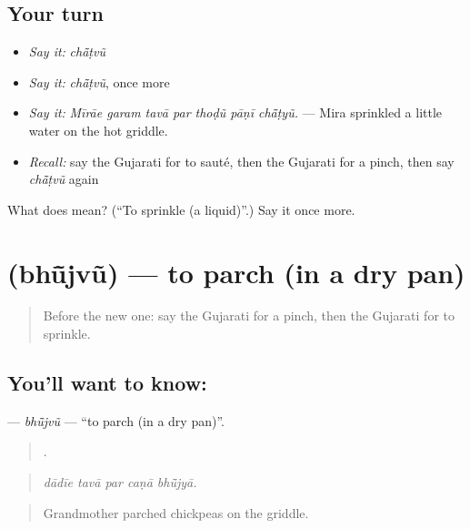 \subsection*{Your turn}
\begin{itemize}
\raggedright
  \item \emph{Say it:} \emph{chā̃ṭvũ}
  \item \emph{Say it:} \emph{chā̃ṭvũ}, once more
  \item \emph{Say it:} \emph{Mīrāe garam tavā par thoḍũ pāṇī chā̃ṭyũ.} — Mira sprinkled a little water on the hot griddle.
  \item \emph{Recall:} say the Gujarati for to sauté, then the Gujarati for a pinch, then say \emph{chā̃ṭvũ} again
\end{itemize}

\begin{tcolorbox}[breakable,colback=teal!4,colframe=teal!35!black,title={Before you move on}]
What does  mean? (\textquotedblleft{}To sprinkle (a liquid)\textquotedblright{}.) Say it once more.
\end{tcolorbox}
\section[\texorpdfstring{\gu{ભૂંજવું} (bhū̃jvũ)}{ભૂંજવું (bhū̃jvũ)}]{ (bhū̃jvũ) — to parch (in a dry pan)}

\label{lesson:GU-C520-bhujvu}



\begin{quote}
Before the new one: say the Gujarati for a pinch, then the Gujarati for to sprinkle.
\end{quote}

\subsection*{You'll want to know: }
\textbf{} — \emph{bhū̃jvũ} — \textquotedblleft{}to parch (in a dry pan)\textquotedblright{}.

\begin{quote}
    .
\end{quote}

\begin{quote}
\emph{dādīe tavā par caṇā bhū̃jyā.}
\end{quote}

\begin{quote}
Grandmother parched chickpeas on the griddle.
\end{quote}

